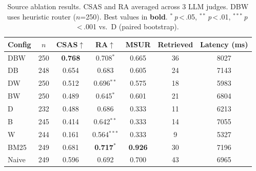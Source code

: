 \begin{table}[t]
\caption{Source ablation results. CSAS and RA averaged across 3 LLM judges.
DBW uses heuristic router ($n$=250). Best values in \textbf{bold}.
$^*$\,\textit{p}\,<\,.05, $^{**}$\,\textit{p}\,<\,.01, $^{***}$\,\textit{p}\,<\,.001 vs.\ D (paired bootstrap).}
\label{tab:ablation}
\centering
\small
\begin{tabular}{lcccccc}
\toprule
Config & $n$ & CSAS$\uparrow$ & RA$\uparrow$ & MSUR & Retrieved & Latency (ms) \\
\midrule
DBW & 250 & \textbf{0.768} & 0.708$^{*}$ & 0.665 & 36 & 8027 \\
DB & 248 & 0.654 & 0.683 & 0.605 & 24 & 7143 \\
DW & 250 & 0.512 & 0.696$^{**}$ & 0.575 & 18 & 5983 \\
BW & 250 & 0.489 & 0.645$^{*}$ & 0.601 & 21 & 6804 \\
D & 232 & 0.488 & 0.686 & 0.333 & 11 & 6213 \\
B & 245 & 0.414 & 0.642$^{**}$ & 0.333 & 14 & 7055 \\
W & 244 & 0.161 & 0.564$^{***}$ & 0.333 & 9 & 5327 \\
\midrule
BM25 & 249 & 0.681 & \textbf{0.717}$^{*}$ & \textbf{0.926} & 30 & 7196 \\
Naive & 249 & 0.596 & 0.692 & 0.700 & 43 & 6965 \\
\bottomrule
\end{tabular}
\end{table}